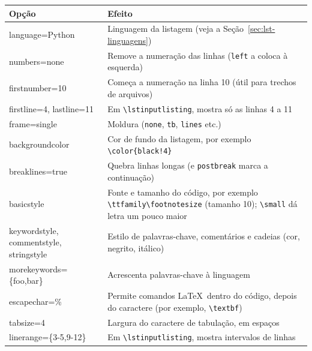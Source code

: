 \begin{quadro}[htbp]
\begin{ilustracao}[\linewidth]{\caption[Opções mais usadas do pacote listings]{Opções mais usadas do pacote \texttt{listings}}\label{qua:lst-opcoes}}{\elaboracaopropria}
  \renewcommand{\arraystretch}{1.2}
  \small
  \begin{tabularx}{\linewidth}{|>{\ttfamily\raggedright\arraybackslash}p{4.2cm}|X|}
    \hline
    \textnormal{\textbf{Opção}} & \textbf{Efeito} \\
    \hline
    language=Python & Linguagem da listagem (veja a Seção~\ref{sec:lst-linguagens}) \\
    \hline
    numbers=none & Remove a numeração das linhas (\texttt{left} a coloca à esquerda) \\
    \hline
    firstnumber=10 & Começa a numeração na linha 10 (útil para trechos de arquivos) \\
    \hline
    firstline=4, lastline=11 & Em \texttt{\textbackslash lstinputlisting}, mostra só as linhas 4 a 11 \\
    \hline
    frame=single & Moldura (\texttt{none}, \texttt{tb}, \texttt{lines} etc.) \\
    \hline
    backgroundcolor & Cor de fundo da listagem, por exemplo \texttt{\textbackslash color\{black!4\}} \\
    \hline
    breaklines=true & Quebra linhas longas (e \texttt{postbreak} marca a continuação) \\
    \hline
    basicstyle & Fonte e tamanho do código, por exemplo \texttt{\textbackslash ttfamily\textbackslash footnotesize} (tamanho 10); \texttt{\textbackslash small} dá letra um pouco maior \\
    \hline
    keywordstyle, commentstyle, stringstyle & Estilo de palavras-chave, comentários e cadeias (cor, negrito, itálico) \\
    \hline
    morekeywords=\{foo,\allowbreak bar\} & Acrescenta palavras-chave à linguagem \\
    \hline
    escapechar=\% & Permite comandos \LaTeX\ dentro do código, depois do caractere (por exemplo, \texttt{\textbackslash textbf}) \\
    \hline
    tabsize=4 & Largura do caractere de tabulação, em espaços \\
    \hline
    linerange=\{3-5,9-12\} & Em \texttt{\textbackslash lstinputlisting}, mostra intervalos de linhas \\
    \hline
  \end{tabularx}
\end{ilustracao}
\end{quadro}

